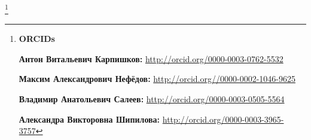 \thanks{{\bf ORCIDs}



{\bf Антон Витальевич Карпишков:} \url{http://orcid.org/0000-0003-0762-5532}



{\bf Максим Александрович Нефёдов:} \url{http://orcid.org//0000-0002-1046-9625}



{\bf Владимир Анатольевич Салеев:} \url{http://orcid.org/0000-0003-0505-5564}



{\bf Александра Викторовна Шипилова:} \url{http://orcid.org/0000-0003-3965-3757}



}





\RusRef



